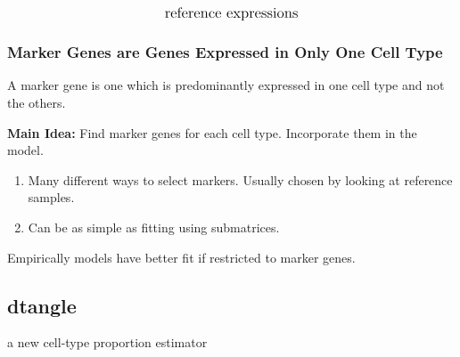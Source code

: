 \documentclass[usenames,dvipsnames,15pt]{beamer}
\renewcommand{\alert}[1]{{\color{NavyBlue} #1}}
\begin{document}
\begin{frame}
\[\begin{aligned}
{{{  }}_{\text{\large reference expressions}}}
  \end{aligned}
  \]\vspace{-.5cm}
\end{frame}


\begin{frame}
  \frametitle{Marker Genes are Genes Expressed in Only One Cell Type}

  A \alert{marker gene} is one which is predominantly expressed in one cell type and not the others.

  {\bf Main Idea:} Find marker genes for each cell type. Incorporate them in the model. 
  \begin{enumerate}
  \item Many different ways to select markers. Usually chosen by looking at \alert{reference samples}.
  \item Can be as simple as fitting using submatrices.
  \end{enumerate}


  {\color{NavyBlue}Empirically models have better fit if restricted to marker genes.\newline}

    
\end{frame}

\setcounter{subsection}{0}

{ 
\begin{frame}[noframenumbering]
  \section{dtangle}
  \begin{center}a new cell-type proportion estimator\end{center}
\end{frame}
}
\end{document}
